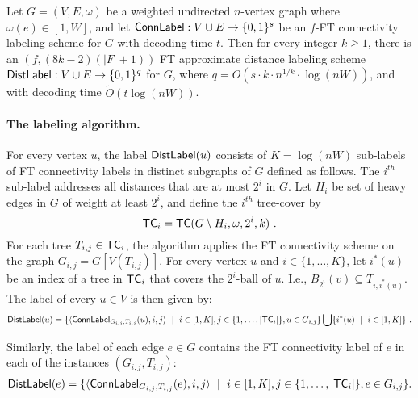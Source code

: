 \begin{lemma}\label{lem:reduction}
Let $G=(V,E, \omega)$ be a weighted undirected $n$-vertex graph where $\omega(e)\in [1,W]$, and let 
$\mathsf{ConnLabel}: V \cup E \to \{0,1\}^s$ be an $f$-FT connectivity labeling scheme for $G$ with decoding time $t$. Then for every integer $k\geq 1$, there is an $(f,(8k-2)(|F|+1))$ FT approximate distance labeling scheme $\mathsf{DistLabel}: V \cup E \to \{0,1\}^{q}$ for $G$, where $q=O(s \cdot k \cdot n^{1/k}\cdot \log (nW))$, and with decoding time $\widetilde{O}(t \log{(nW)})$. %
\end{lemma}

\paragraph{The labeling algorithm.}
For every vertex $u$, the label $\mathsf{DistLabel}(u)$ consists of $K=\log(nW)$ sub-labels of FT connectivity labels in distinct subgraphs of $G$ defined as follows. The $i^{th}$ sub-label addresses all distances that are at most $2^i$ in $G$. Let $H_i$ be set of heavy edges in $G$ of weight at least $2^i$, and define the $i^{th}$ tree-cover by 
\begin{equation}\label{eq:TC-i}
\mathsf{TC}_i=\mathsf{TC}(G\setminus H_i,\omega, 2^i,k)~.
\end{equation}
For each tree $T_{i,j} \in \mathsf{TC}_i$, the algorithm applies the FT connectivity scheme on the graph $G_{i,j}=G[V(T_{i,j})]$. For every vertex $u$ and $i \in \{1,\ldots, K\}$, let $i^*(u)$ be an index of a tree in $\mathsf{TC}_i$ that covers the $2^i$-ball of $u$. I.e., $B_{2^i}(v) \subseteq T_{i,i^*(u)}$. 
The label of every $u \in V$ is then given by:
$$\mathsf{DistLabel}(u)=\{\langle \mathsf{ConnLabel}_{G_{i,j},T_{i,j}}(u), i,j \rangle ~\mid~ i \in [1,K], j \in \{1,\ldots, |\mathsf{TC}_i|\}, u \in G_{i,j}\} \bigcup \{i^*(u) ~\mid~ i \in [1,K]\}~.$$

Similarly, the label of each edge $e \in G$ contains the FT connectivity label of $e$ in each of the instances $(G_{i,j}, T_{i,j})$:
$$\mathsf{DistLabel}(e)=\{\langle \mathsf{ConnLabel}_{G_{i,j},T_{i,j}}(e), i,j \rangle ~\mid~ i \in [1,K], j \in \{1,\ldots, |\mathsf{TC}_i|\}, e \in G_{i,j}\}.$$ 

